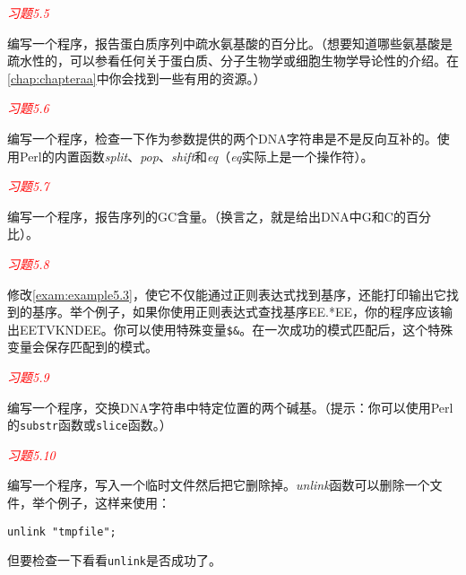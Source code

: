 \textcolor{red}{\textit{习题5.5}}
\begin{adjustwidth}{2em}{}
编写一个程序，报告蛋白质序列中疏水氨基酸的百分比。（想要知道哪些氨基酸是疏水性的，可以参看任何关于蛋白质、分子生物学或细胞生物学导论性的介绍。在\autoref{chap:chapteraa}中你会找到一些有用的资源。）
\end{adjustwidth}

\textcolor{red}{\textit{习题5.6}}
\begin{adjustwidth}{2em}{}
编写一个程序，检查一下作为参数提供的两个DNA字符串是不是反向互补的。使用Perl的内置函数\textit{split}、\textit{pop}、\textit{shift}和\textit{eq}（\textit{eq}实际上是一个操作符）。
\end{adjustwidth}

\textcolor{red}{\textit{习题5.7}}
\begin{adjustwidth}{2em}{}
编写一个程序，报告序列的GC含量。（换言之，就是给出DNA中G和C的百分比）。
\end{adjustwidth}

\textcolor{red}{\textit{习题5.8}}
\begin{adjustwidth}{2em}{}
修改\autoref{exam:example5.3}，使它不仅能通过正则表达式找到基序，还能打印输出它找到的基序。举个例子，如果你使用正则表达式查找基序EE.*EE，你的程序应该输出EETVKNDEE。你可以使用特殊变量\verb|$&|。在一次成功的模式匹配后，这个特殊变量会保存匹配到的模式。
\end{adjustwidth}

\textcolor{red}{\textit{习题5.9}}
\begin{adjustwidth}{2em}{}
编写一个程序，交换DNA字符串中特定位置的两个碱基。（提示：你可以使用Perl的\verb|substr|函数或\verb|slice|函数。）
\end{adjustwidth}

\textcolor{red}{\textit{习题5.10}}
\begin{adjustwidth}{2em}{}
编写一个程序，写入一个临时文件然后把它删除掉。\textit{unlink}函数可以删除一个文件，举个例子，这样来使用：
\begin{lstlisting}
unlink "tmpfile";
\end{lstlisting}
但要检查一下看看\verb|unlink|是否成功了。
\end{adjustwidth}
